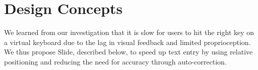 \section{Design Concepts}

We learned from our investigation that it is slow for users to hit the right key on a virtual keyboard due to the lag in visual feedback and limited proprioception.   We thus propose Slide, described below, to speed up text entry by using relative positioning and reducing the need for accuracy through auto-correction. 

